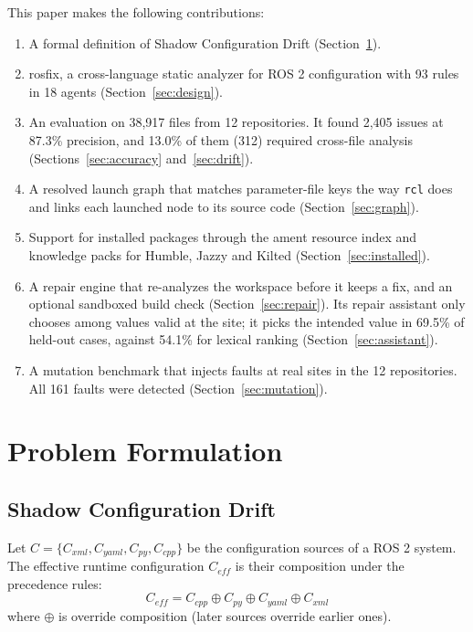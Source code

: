 \documentclass[conference]{IEEEtran}
\newcommand{\code}[1]{\texttt{#1}}
\begin{document}
This paper makes the following contributions:
\begin{enumerate}
\item A formal definition of Shadow Configuration Drift (Section~\ref{sec:problem}).
\item rosfix, a cross-language static analyzer for ROS 2 configuration with 93 rules in 18
  agents (Section~\ref{sec:design}).
\item An evaluation on 38,917 files from 12 repositories. It found 2,405 issues at 87.3\%
  precision, and 13.0\% of them (312) required cross-file analysis (Sections~\ref{sec:accuracy}
  and~\ref{sec:drift}).
\item A resolved launch graph that matches parameter-file keys the way \code{rcl} does and links
  each launched node to its source code (Section~\ref{sec:graph}).
\item Support for installed packages through the ament resource index and knowledge packs for
  Humble, Jazzy and Kilted (Section~\ref{sec:installed}).
\item A repair engine that re-analyzes the workspace before it keeps a fix, and an optional
  sandboxed build check (Section~\ref{sec:repair}). Its repair assistant only chooses among values
  valid at the site; it picks the intended value in 69.5\% of held-out cases, against 54.1\% for
  lexical ranking (Section~\ref{sec:assistant}).
\item A mutation benchmark that injects faults at real sites in the 12 repositories. All 161
  faults were detected (Section~\ref{sec:mutation}).
\end{enumerate}

\section{Problem Formulation}
\label{sec:problem}

\subsection{Shadow Configuration Drift}

Let $C = \{C_{xml}, C_{yaml}, C_{py}, C_{cpp}\}$ be the configuration sources of a ROS 2
system. The effective runtime configuration $C_{eff}$ is their composition under the precedence
rules:
\begin{equation}
C_{eff} = C_{cpp} \oplus C_{py} \oplus C_{yaml} \oplus C_{xml}
\end{equation}
where $\oplus$ is override composition (later sources override earlier ones).
\end{document}
